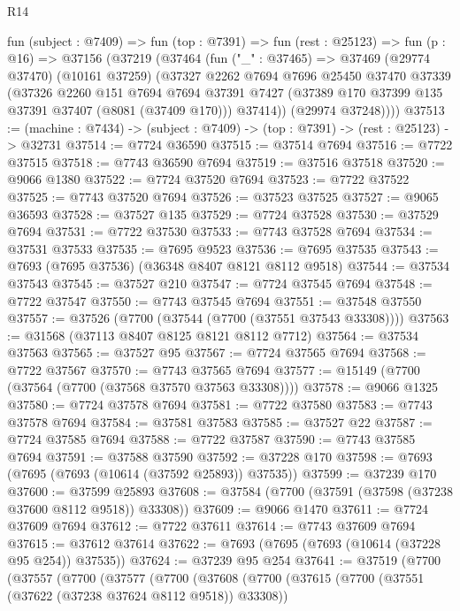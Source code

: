 \begin{lexlean}{R14}
\begin{coremodule}
  fun (subject : @7409) =>
  fun (top : @7391) =>
  fun (rest : @25123) =>
  fun (p : @16) =>
  @37156
    (@37219
      (@37464
        (fun ("_" : @37465) =>
        @37469
          (@29774 @37470)
          (@10161 @37259)
          (@37327
            @2262
            @7694
            @7696
            @25450
            @37470
            @37339
            (@37326
              @2260
              @151
              @7694
              @7694
              @37391
              @7427
              (@37389 @170 @37399 @135 @37391 @37407 (@8081 (@37409 @170)))
              @37414))
          (@29974 @37248))))
@37513 := (machine : @7434) -> (subject : @7409) -> (top : @7391) -> (rest : @25123) -> @32731
@37514 := @7724 @36590
@37515 := @37514 @7694
@37516 := @7722 @37515
@37518 := @7743 @36590 @7694
@37519 := @37516 @37518
@37520 := @9066 @1380
@37522 := @7724 @37520 @7694
@37523 := @7722 @37522
@37525 := @7743 @37520 @7694
@37526 := @37523 @37525
@37527 := @9065 @36593
@37528 := @37527 @135
@37529 := @7724 @37528
@37530 := @37529 @7694
@37531 := @7722 @37530
@37533 := @7743 @37528 @7694
@37534 := @37531 @37533
@37535 := @7695 @9523
@37536 := @7695 @37535
@37543 := @7693 (@7695 @37536) (@36348 @8407 @8121 @8112 @9518)
@37544 := @37534 @37543
@37545 := @37527 @210
@37547 := @7724 @37545 @7694
@37548 := @7722 @37547
@37550 := @7743 @37545 @7694
@37551 := @37548 @37550
@37557 := @37526 (@7700 (@37544 (@7700 (@37551 @37543 @33308))))
@37563 := @31568 (@37113 @8407 @8125 @8121 @8112 @7712)
@37564 := @37534 @37563
@37565 := @37527 @95
@37567 := @7724 @37565 @7694
@37568 := @7722 @37567
@37570 := @7743 @37565 @7694
@37577 := @15149 (@7700 (@37564 (@7700 (@37568 @37570 @37563 @33308))))
@37578 := @9066 @1325
@37580 := @7724 @37578 @7694
@37581 := @7722 @37580
@37583 := @7743 @37578 @7694
@37584 := @37581 @37583
@37585 := @37527 @22
@37587 := @7724 @37585 @7694
@37588 := @7722 @37587
@37590 := @7743 @37585 @7694
@37591 := @37588 @37590
@37592 := @37228 @170
@37598 := @7693 (@7695 (@7693 (@10614 (@37592 @25893)) @37535))
@37599 := @37239 @170
@37600 := @37599 @25893
@37608 := @37584 (@7700 (@37591 (@37598 (@37238 @37600 @8112 @9518)) @33308))
@37609 := @9066 @1470
@37611 := @7724 @37609 @7694
@37612 := @7722 @37611
@37614 := @7743 @37609 @7694
@37615 := @37612 @37614
@37622 := @7693 (@7695 (@7693 (@10614 (@37228 @95 @254)) @37535))
@37624 := @37239 @95 @254
@37641 := @37519
    (@7700
      (@37557
        (@7700
          (@37577
            (@7700
              (@37608
                (@7700
                  (@37615
                    (@7700 (@37551 (@37622 (@37238 @37624 @8112 @9518)) @33308))

\end{coremodule}
\end{lexlean}
